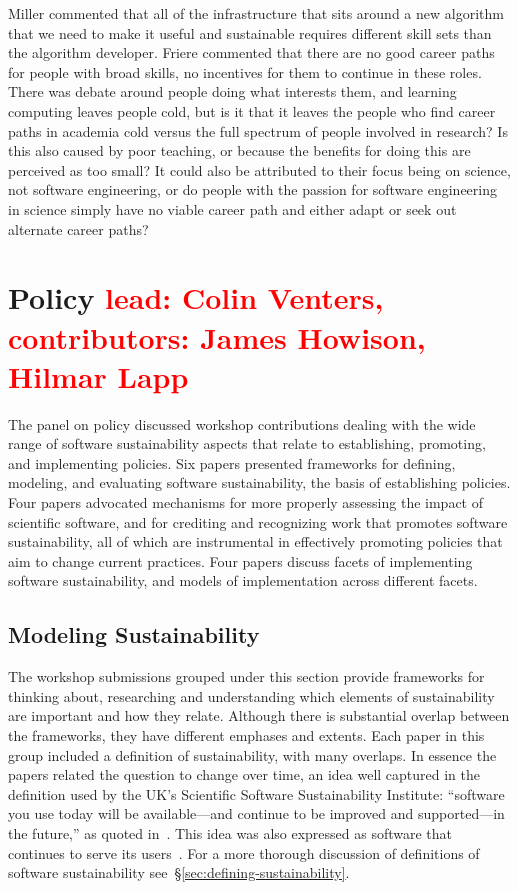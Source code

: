 \documentclass[11pt, oneside]{amsart}
\newcommand{\note}[1]{ {\textcolor{red}    { #1 }}}
\begin{document}
Miller commented that all of the infrastructure that sits around a new
algorithm that we need to make it useful and sustainable requires different
skill sets than the algorithm developer. Friere commented that there are no
good career paths for people with broad skills, no incentives for them to
continue in these roles. There was debate around people doing what interests
them, and learning computing leaves people cold, but is it that it leaves the
people who find career paths in academia cold versus the full spectrum of
people involved in research? Is this also caused by poor teaching, or because the
benefits for doing this are perceived as too small? It could also be attributed to
their focus being on science, not software engineering, or do people with
the passion for software engineering in science simply have no viable career
path and either adapt or seek out alternate career paths?

\section{Policy \note{lead: Colin Venters, contributors: James Howison, Hilmar Lapp}} \label{sec:policy}

The  panel on policy  discussed workshop
contributions dealing with the wide range of software sustainability
aspects that relate to establishing, promoting, and implementing
policies. Six papers presented frameworks for defining, modeling, and
evaluating software sustainability, the basis of establishing
policies. Four papers advocated mechanisms for more properly assessing
the impact of scientific software, and for crediting and recognizing
work that promotes software sustainability, all of which are
instrumental in effectively promoting policies that aim to change
current practices. Four papers discuss facets of implementing software
sustainability, and models of implementation across different facets.
 
\subsection{Modeling Sustainability}

The workshop submissions grouped under this section provide frameworks
for thinking about, researching and understanding which elements of sustainability
are important and how they relate. Although there is substantial
overlap between the frameworks, they have different emphases and
extents.  Each paper in this group included a definition of sustainability,
with many overlaps.  In essence the papers related the question to
change over time, an idea well captured in the definition used by the
UK's Scientific Software Sustainability Institute: ``software you use
today will be available---and continue to be improved and
supported---in the future,'' as quoted in~\cite{Venters_WSSSPE}. This
idea was also expressed as software that continues to serve its
users~\cite{Pierce_WSSSPE}.  For a more thorough discussion of definitions
of software sustainability see~\S\ref{sec:defining-sustainability}.
\end{document}
